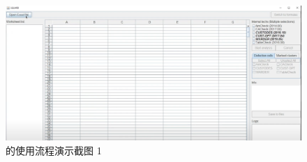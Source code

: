 \begin{figure}[tp]   
    \centering
    \includegraphics[width=\textwidth]{figure/sg/sguard-1.png}
    \caption{\sg 的使用流程演示截图 1}
    \label{figure-sg1}
\end{figure}